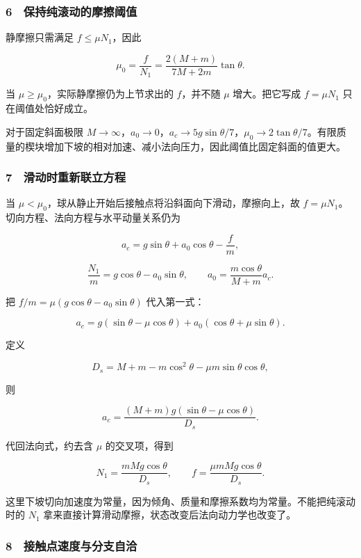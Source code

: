 \documentclass[12pt,a4paper,fontset=fandol]{ctexart}
\begin{document}
\subsubsection{6　保持纯滚动的摩擦阈值}\label{ux4fddux6301ux7eafux6edaux52a8ux7684ux6469ux64e6ux9608ux503c}

静摩擦只需满足 \(f\le\mu N_1\)，因此

\[\mu_0=\frac f{N_1}
=\boxed{\frac{2(M+m)}{7M+2m}\tan\theta.}\]

当 \(\mu\ge\mu_0\)，实际静摩擦仍为上节求出的 \(f\)，并不随 \(\mu\)
增大。把它写成 \(f=\mu N_1\) 只在阈值处恰好成立。

对于固定斜面极限
\(M\to\infty\)，\(a_0\to0\)，\(a_c\to5g\sin\theta/7\)，\(\mu_0\to2\tan\theta/7\)。有限质量的楔块增加下坡的相对加速、减小法向压力，因此阈值比固定斜面的值更大。

\subsubsection{7　滑动时重新联立方程}\label{ux6ed1ux52a8ux65f6ux91cdux65b0ux8054ux7acbux65b9ux7a0b}

当 \(\mu<\mu_0\)，球从静止开始后接触点将沿斜面向下滑动，摩擦向上，故
\(f=\mu N_1\)。切向方程、法向方程与水平动量关系仍为

\[a_c=g\sin\theta+a_0\cos\theta-\frac fm,\]

\[\frac{N_1}{m}=g\cos\theta-a_0\sin\theta,\qquad
a_0=\frac{m\cos\theta}{M+m}a_c.\]

把 \(f/m=\mu(g\cos\theta-a_0\sin\theta)\) 代入第一式：

\[a_c=g(\sin\theta-\mu\cos\theta)
+a_0(\cos\theta+\mu\sin\theta).\]

定义

\[D_s=M+m-m\cos^2\theta-\mu m\sin\theta\cos\theta,\]

则

\[\boxed{a_c=\frac{(M+m)g(\sin\theta-\mu\cos\theta)}{D_s}.}\]

代回法向式，约去含 \(\mu\) 的交叉项，得到

\[\boxed{N_1=\frac{mMg\cos\theta}{D_s},\qquad
f=\frac{\mu mMg\cos\theta}{D_s}.}\]

这里下坡切向加速度为常量，因为倾角、质量和摩擦系数均为常量。不能把纯滚动时的
\(N_1\) 拿来直接计算滑动摩擦，状态改变后法向动力学也改变了。

\subsubsection{8　接触点速度与分支自洽}\label{ux63a5ux89e6ux70b9ux901fux5ea6ux4e0eux5206ux652fux81eaux6d3d}
\end{document}
